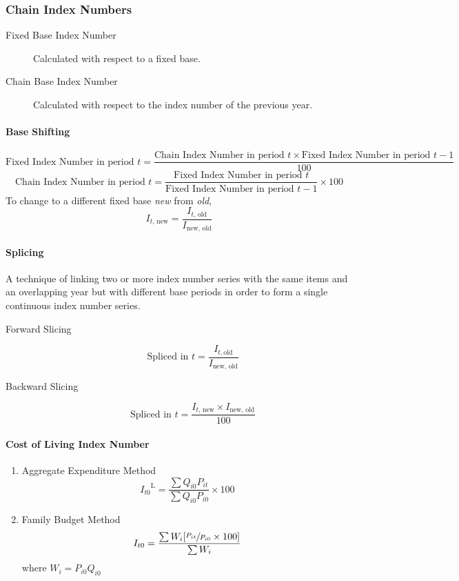 \documentclass[
10pt, %
a4paper, %
]{report}
\begin{document}
\subsubsection*{Chain Index Numbers}
\begin{description}
\item[Fixed Base Index Number] Calculated with respect to a fixed base.
\item[Chain Base Index Number] Calculated with respect to the index number of the previous year.
\end{description}

\paragraph*{Base Shifting}
\[
\text{Fixed Index Number in period } t = \frac{\text{Chain Index Number in period } t \times \text{Fixed Index Number in period } t-1}{100}
\]
\[
\text{Chain Index Number in period } t = \frac{\text{Fixed Index Number in period } t}{\text{Fixed Index Number in period } t-1} \times 100
\]
To change to a different fixed base \textit{new} from \textit{old},
\[
I_{t\text{, new}} = \frac{I_{t\text{, old}}}{I_{\text{new, old}}}
\]

\paragraph*{Splicing}
A technique of linking two or more index number series with the same items and an overlapping year but with different base periods in order to form a single continuous index number series.

\begin{description}
\item[Forward Slicing]
\[\text{Spliced in } t = \frac{I_{t, \text{old}}}{I_{\text{new, old}}}\]
\item[Backward Slicing]
\[
\text{Spliced in } t = \frac{I_{t\text{, new}} \times I_{\text{new, old}}}{100}
\]
\end{description}

\paragraph*{Cost of Living Index Number}
\begin{enumerate}
\item Aggregate Expenditure Method
\[{I_{t0}}^\mathrm{L} = \frac{\sum Q_{i0} P_{it}}{\sum Q_{i0} P_{i0}} \times 100\]
\item Family Budget Method
\[I_{t0} = \frac{\sum W_i [\sfrac{P_{it}}{P_{i0}} \times 100]}{\sum W_i}\]
where \(W_i = P_{i0}Q_{i0}\)
\end{enumerate}
\end{document}
